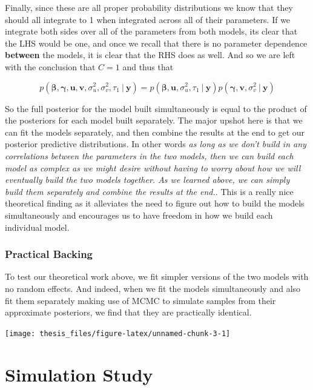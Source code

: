 \documentclass[12pt,twoside]{reedthesis}
\begin{document}
Finally, since these are all proper probability distributions we know that they should all integrate to 1 when integrated across all of their parameters. If we integrate both sides over all of the parameters from both models, its clear that the LHS would be one, and once we recall that there is no parameter dependence \textbf{between} the models, it is clear that the RHS does as well. And so we are left with the conclusion that \(C = 1\) and thus that

\[
p(\boldsymbol{\beta}, \boldsymbol{\gamma}, \mathbf{u}, \mathbf{v}, \sigma_u^2, \sigma_v^2, \tau_1\ | \ \mathbf{y})  = p(\boldsymbol{\beta}, \mathbf{u}, \sigma_u^2, \tau_1 \ | \ \mathbf{y})p(\boldsymbol{\gamma}, \mathbf{v}, \sigma_v^2 \ | \ \mathbf{y}) 
\]

So the full posterior for the model built simultaneously is equal to the product of the posteriors for each model built separately. The major upshot here is that we can fit the models separately, and then combine the results at the end to get our posterior predictive distributions. In other words \emph{as long as we don't build in any correlations between the parameters in the two models, then we can build each model as complex as we might desire without having to worry about how we will eventually build the two models together. As we learned above, we can simply build them separately and combine the results at the end.}. This is a really nice theoretical finding as it alleviates the need to figure out how to build the models simultaneously and encourages us to have freedom in how we build each individual model.

\hypertarget{practical-backing}{%
\subsection{Practical Backing}\label{practical-backing}}

To test our theoretical work above, we fit simpler versions of the two models with no random effects. And indeed, when we fit the models simultaneously and also fit them separately making use of MCMC to simulate samples from their approximate posteriors, we find that they are practically identical.
\begin{center}\texttt{[image: thesis\_files/figure-latex/unnamed-chunk-3-1]} \end{center}

\hypertarget{sim-study}{%
\chapter{Simulation Study}\label{sim-study}}
\end{document}
